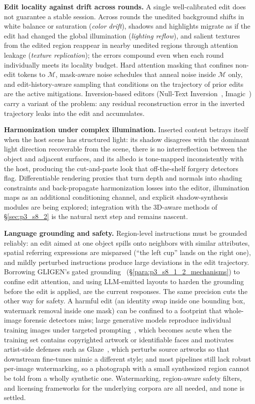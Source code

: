 \textbf{Edit locality against drift across rounds.}
A single well-calibrated edit does not guarantee a stable session.
Across rounds the unedited background shifts in white balance or saturation (\emph{color drift}), shadows and highlights migrate as if the edit had changed the global illumination (\emph{lighting reflow}), and salient textures from the edited region reappear in nearby unedited regions through attention leakage (\emph{texture replication}); the errors compound even when each round individually meets its locality budget.
Hard attention masking that confines non-edit tokens to $\mathcal{M}$, mask-aware noise schedules that anneal noise inside $\mathcal{M}$ only, and edit-history-aware sampling that conditions on the trajectory of prior edits are the active mitigations.
Inversion-based editors (Null-Text Inversion~\cite{mokady2023nulltext}, Imagic~\cite{kawar2023imagic}) carry a variant of the problem: any residual reconstruction error in the inverted trajectory leaks into the edit and accumulates.

\textbf{Harmonization under complex illumination.}
Inserted content betrays itself when the host scene has structured light: its shadow disagrees with the dominant light direction recoverable from the scene, there is no interreflection between the object and adjacent surfaces, and its albedo is tone-mapped inconsistently with the host, producing the cut-and-paste look that off-the-shelf forgery detectors flag.
Differentiable rendering proxies that turn depth and normals into shading constraints and back-propagate harmonization losses into the editor, illumination maps as an additional conditioning channel, and explicit shadow-synthesis modules are being explored; integration with the 3D-aware methods of §\ref{sec:p3_s8_2} is the natural next step and remains nascent.

\textbf{Language grounding and safety.}
Region-level instructions must be grounded reliably: an edit aimed at one object spills onto neighbors with similar attributes, spatial referring expressions are misparsed (``the left cup'' lands on the right one), and mildly perturbed instructions produce large deviations in the edit trajectory.
Borrowing GLIGEN's gated grounding~\cite{li2023gligen} (§\ref{para:p3_s8_1_2_mechanisms}) to confine edit attention, and using LLM-emitted layouts to harden the grounding before the edit is applied, are the current responses.
The same precision cuts the other way for safety.
A harmful edit (an identity swap inside one bounding box, watermark removal inside one mask) can be confined to a footprint that whole-image forensic detectors miss; large generative models reproduce individual training images under targeted prompting~\cite{somepalli2023diffusion}, which becomes acute when the training set contains copyrighted artwork or identifiable faces and motivates artist-side defenses such as Glaze~\cite{shan2023glaze}, which perturbs source artworks so that downstream fine-tunes mimic a different style; and most pipelines still lack robust per-image watermarking, so a photograph with a small synthesized region cannot be told from a wholly synthetic one.
Watermarking, region-aware safety filters, and licensing frameworks for the underlying corpora are all needed, and none is settled.

